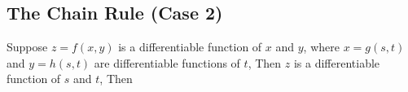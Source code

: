 \documentclass[a4paper,11pt,twoside]{report}
\begin{document}
\subsection{The Chain Rule (Case 2)}%
\label{sub:the_chain_rule_case_2_}

Suppose $z = f(x,y)$ is a differentiable function of $x$ and $y$, where $x= g(s,t)$ and $y = h(s,t)$ are
differentiable functions of $t$, Then $z$ is a differentiable function of $s$ and $t$, Then








\newpage
\end{document}
